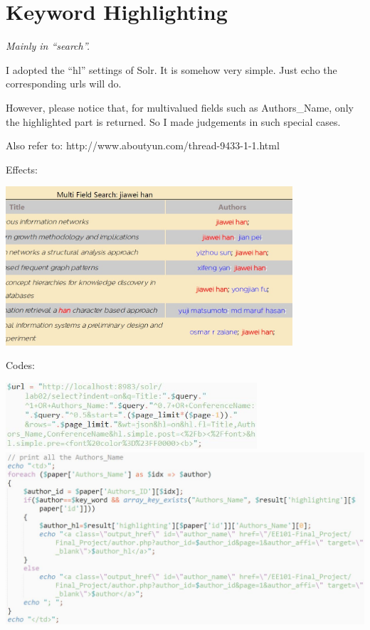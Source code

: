 \documentclass[10pt,twoside,a4paper,titlepage]{article}
\begin{document}
	\newpage

	\section{Keyword Highlighting}
		\emph{Mainly in “search”.}\newline\par
		I adopted the “hl” settings of Solr. It is somehow very simple. Just echo the corresponding urls will do.\par
		However, please notice that, for multivalued fields such as Authors\_Name, only the highlighted part is returned. So I made judgements in such special cases.\par
		Also refer to: http://www.aboutyun.com/thread-9433-1-1.html\newline\par
		Effects:\newline\par
		\includegraphics[width=0.8\textwidth]{gzl/02.png}\newline\par
		Codes:\newline\par
		\includegraphics[width=0.7\textwidth]{gzl/02.jpg}
			\newpage
		\includegraphics[width=1\textwidth]{gzl/03.jpg}\par
\end{document}
